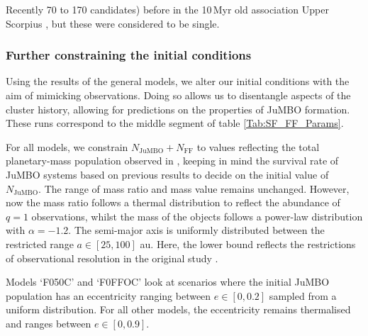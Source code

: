 \documentclass[aa]{lib/aa}
\begin{document}
Recently 
70 to 170 candidates) before in the 10\,Myr old association
Upper Scorpius \cite{2022NatAs...6...89M}, but these were considered
to be single. 

\subsubsection{Further constraining the initial conditions}
Using the results of the general models, we alter our initial
conditions with the aim of mimicking observations. Doing so allows us
to disentangle aspects of the cluster history, allowing for
predictions on the properties of JuMBO formation. These runs
correspond to the middle segment of table \ref{Tab:SF_FF_Params}.
    
For all models, we constrain $N_{\mathrm{JuMBO}} + N_{\mathrm{FF}}$ to
values reflecting the total planetary-mass population observed in
\citet{2023arXiv231001231P}, keeping in mind the survival rate of
JuMBO systems based on previous results to decide on the initial value
of $N_{\mathrm{JuMBO}}$. The range of mass ratio and mass value
remains unchanged. However, now the mass ratio follows a thermal
distribution to reflect the abundance of $q=1$ observations, whilst
the mass of the objects follows a power-law distribution with $\alpha
= -1.2$. The semi-major axis is uniformly distributed between the
restricted range $a\in[25,100]$ au. Here, the lower bound reflects the
restrictions of observational resolution in the original study
\citep{2023arXiv231001231P}.
    
Models `F050C' and `F0FFOC' look at scenarios where the initial JuMBO
population has an eccentricity ranging between $e\in[0,0.2]$ sampled
from a uniform distribution. For all other models, the eccentricity
remains thermalised and ranges between $e\in[0,0.9]$.
 
\end{document}
